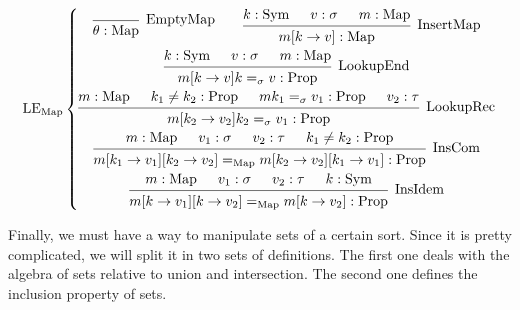 \documentclass[]{article}
\newcommand{\1}{\mathbbm{1}}
\newcommand{\0}{\mathbbm{0}}
\newcommand{\Prop}{\text{Prop}}
\newcommand{\Sym}{\text{Sym}}
\newcommand{\Map}{\text{Map}}
\newcommand{\proof}[1]{{\scantokens{\begin{prooftree}#1\end{prooftree}}}}
\begin{document}
\[\text{LE}_\text{Map}\left\{
    \begin{gathered}
        \proof{
            \infer0[EmptyMap]{\theta:\Map}
        }
        \qquad\proof{
            \hypo{k : \Sym}
            \hypo{v : \sigma}
            \hypo{m : \Map}
            \infer3[InsertMap]{m[k\rightarrow v] : \Map}
        }\\
        \proof{
            \hypo{k : \Sym}
            \hypo{v : \sigma}
            \hypo{m : \Map}
            \infer3[LookupEnd]{m[k\rightarrow v]k =_\sigma v:\Prop}
        }\\
        \proof{
            \hypo{m : \Map}
            \hypo{k_1\neq k_2 : \Prop}
            \hypo{m k_1 =_\sigma v_1 : \Prop}
            \hypo{v_2 : \tau}
            \infer4[LookupRec]{m[k_2\rightarrow v_2]k_2 =_\sigma v_1 : \Prop}
        }\\
        \proof{
            \hypo{m : \Map}
            \hypo{v_1 : \sigma}
            \hypo{v_2 : \tau}
            \hypo{k_1\neq k_2 : \Prop}
            \infer4[InsCom]{m[k_1\rightarrow v_1][k_2\rightarrow v_2] =_\Map
                    m[k_2\rightarrow v_2][k_1\rightarrow v_1] : \Prop}
        }\\
        \proof{
            \hypo{m : \Map}
            \hypo{v_1 : \sigma}
            \hypo{v_2 : \tau}
            \hypo{k : \Sym}
            \infer4[InsIdem]{m[k\rightarrow v_1][k\rightarrow v_2] =_\Map
                    m[k\rightarrow v_2] : \Prop}
        }
    \end{gathered}
\right.\]

Finally, we must have a way to manipulate sets of a certain sort. Since it is pretty
complicated, we will split it in two sets of definitions. The first one deals with
the algebra of sets relative to union and intersection. The second one defines the
inclusion property of sets.
\end{document}
